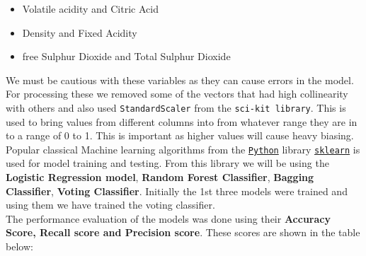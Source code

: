 \documentclass{article}
\begin{document}
\begin{itemize}
    \item Volatile acidity and Citric Acid
    \item Density and Fixed Acidity
    \item free Sulphur Dioxide and Total Sulphur Dioxide
\end{itemize}
We must be cautious with these variables as they can cause errors in the model.\\
For processing these we removed some of the vectors that had high collinearity with others and also used \verb|StandardScaler| from the \verb|sci-kit library|. This is used to bring values from different columns into from whatever range they are in to a range of 0 to 1. This is important as higher values will cause heavy biasing.\\
Popular classical Machine learning algorithms from  the {\href{https://www.python.org/}{\texttt{Python}} library \href{https://scikit-learn.org/stable/index.html}{{\texttt{sklearn}}}} is used for model training and testing. From this library we will be using the \textbf{Logistic Regression model}, \textbf{Random Forest Classifier}, \textbf{Bagging Classifier}, \textbf{Voting Classifier}. Initially the 1st three models were trained and using them we have trained the voting classifier.\\ 
The performance evaluation of the models was done using their \textbf{Accuracy Score, Recall score and Precision score}. These scores are shown in the table below: 
\end{document}
